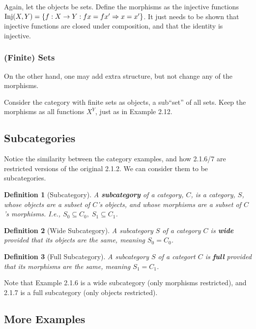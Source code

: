\documentclass[12pt]{article}
\newtheorem{definition}{Definition}
\begin{document}
Again, let the objects be sets. Define the morphisms as the injective functions $\textmd{Inj}(X,Y) = \{f: X \rightarrow Y : fx = fx' \Rightarrow x = x'\}$. It just needs to be shown that injective functions are closed under composition, and that the identity is injective.

\subsubsection{(Finite) Sets}
On the other hand, one may add extra structure, but not change any of the morphisms.

Consider the category with finite sets as objects, a sub``set'' of all sets. Keep the morphisms as all functions $X^Y$, just as in Example 2.12.

\subsection{Subcategories}

Notice the similarity between the category examples, and how 2.1.6/7 are restricted versions of the original 2.1.2. We can consider them to be subcategories.

\begin{definition}[Subcategory]
    A \textbf{subcategory} of a category, $C$, is a category, $S$, whose objects are a subset of $C$'s objects, and whose morphisms are a subset of $C$'s morphisms. I.e., $S_0 \subseteq C_0, \; S_1 \subseteq C_1$.
\end{definition}

\begin{definition}[Wide Subcategory]
    A subcategory $S$ of a category $C$ is \textbf{wide} provided that its objects are the same, meaning $S_0 = C_0$.
\end{definition}

\begin{definition}[Full Subcategory]
    A subcategory $S$ of a categort $C$ is \textbf{full} provided that its morphisms are the same, meaning $S_1 = C_1$.
\end{definition}

Note that Example 2.1.6 is a wide subcategory (only morphisms restricted), and 2.1.7 is a full subcategory (only objects restricted).


\subsection{More Examples}
\end{document}
